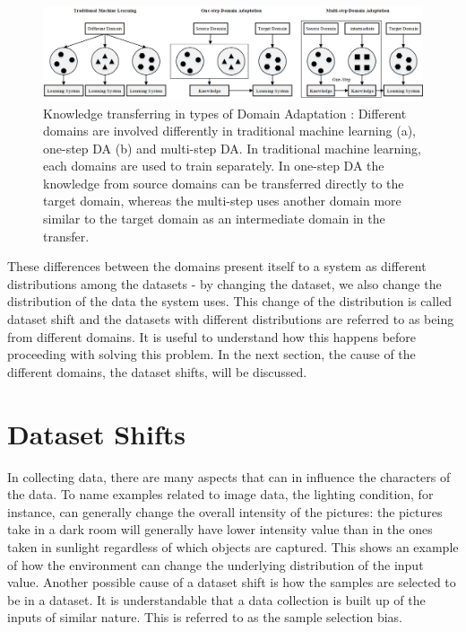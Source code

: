 \begin{figure}[tbh]
  \centering
    \includegraphics[width=\textwidth]{abbildungen/DAsteps.png}
  \caption{Knowledge transferring in types of Domain Adaptation \cite{deepDASurvey}: Different domains are involved differently in traditional machine learning (a), one-step DA (b) and multi-step DA. In traditional machine learning, each domains are used to train separately. In one-step DA the knowledge from source domains can be transferred directly to the target domain, whereas the multi-step uses another domain more similar to the target domain as an intermediate domain in the transfer.} 
  \label{fig:DAsteps}
\end{figure}

These differences between the domains present itself to a system as different distributions among the datasets - by changing the dataset, we also change the distribution of the data the system uses. This change of the distribution is called dataset shift and the datasets with different distributions are referred to as being from different domains. It is useful to understand how this happens before proceeding with solving this problem. In the next section, the cause of the different domains, the dataset shifts, will be discussed. 

\section{Dataset Shifts} \label{sec:datasetShifts}
In collecting data, there are many aspects that can in influence the characters of the data. To name examples related to image data, the lighting condition, for instance, can generally change the overall intensity of the pictures: the pictures take in a dark room will generally have lower intensity value than in the ones taken in sunlight regardless of which objects are captured. This shows an example of how the environment can change the underlying distribution of the input value. Another possible cause of a dataset shift is how the samples are selected to be in a dataset. It is understandable that a data collection is built up of the inputs of similar nature. This is referred to as the sample selection bias.

